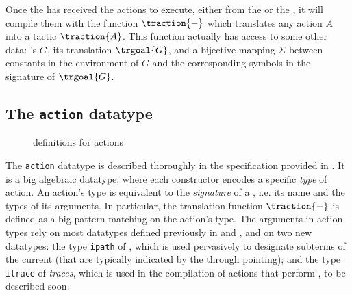 Once the  has received the actions to execute, either from the
 or the , it will compile them with the function
$\traction{-}$ which translates any action $A$ into a  tactic
$\traction{A}$. This function actually has access to some other data: 's
 $G$, its  translation $\trgoal{G}$, and a bijective mapping
$\Sigma$ between  constants in the environment of $G$ and the
corresponding  symbols in the  signature of
$\trgoal{G}$.

\subsection{The \texttt{action} datatype}

\begin{figure}
  
  \caption{ definitions for actions}
\end{figure}

The \texttt{action} datatype is described thoroughly in the  specification
provided in . It is a big algebraic datatype, where each
constructor encodes a specific \emph{type} of action. An action's type is
equivalent to the \emph{signature} of a , i.e. its name and the types
of its arguments. In particular, the translation function $\traction{-}$ is
defined as a big pattern-matching on the action's type. The arguments in action types
rely on most datatypes defined previously in  and
, and on two new datatypes: the type \texttt{ipath} of
\emph{}, which is used pervasively to designate subterms of the current
 (that are typically indicated by the  through
pointing); and the type \texttt{itrace} of \emph{
traces}, which is used in the compilation of  actions that perform
, to be described soon.

